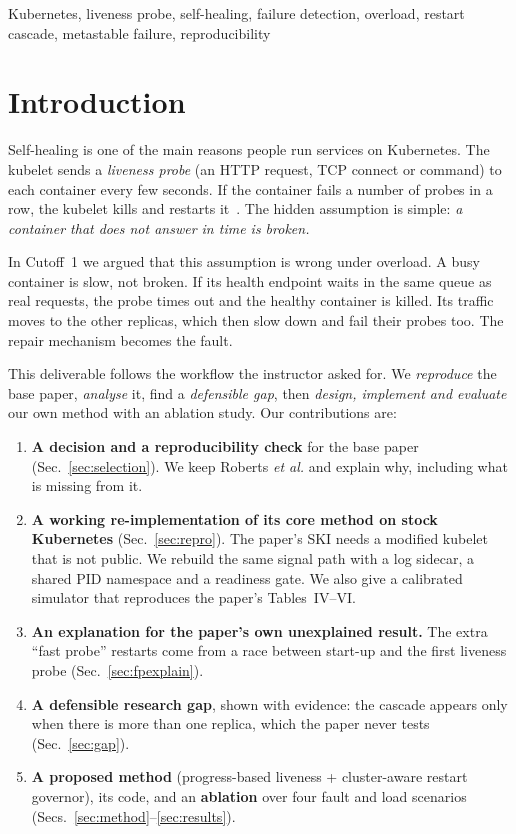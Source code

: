 \documentclass[conference]{IEEEtran}
\begin{document}
\begin{IEEEkeywords}
Kubernetes, liveness probe, self-healing, failure detection, overload,
restart cascade, metastable failure, reproducibility
\end{IEEEkeywords}

\section{Introduction}
Self-healing is one of the main reasons people run services on
Kubernetes. The kubelet sends a \emph{liveness probe} (an HTTP request,
TCP connect or command) to each container every few seconds. If the
container fails a number of probes in a row, the kubelet kills and
restarts it~\cite{k8sprobes}. The hidden assumption is simple:
\emph{a container that does not answer in time is broken.}

In Cutoff~1 we argued that this assumption is wrong under overload. A
busy container is slow, not broken. If its health endpoint waits in the
same queue as real requests, the probe times out and the healthy
container is killed. Its traffic moves to the other replicas, which then
slow down and fail their probes too. The repair mechanism becomes the
fault.

This deliverable follows the workflow the instructor asked for. We
\emph{reproduce} the base paper, \emph{analyse} it, find a
\emph{defensible gap}, then \emph{design, implement and evaluate} our own
method with an ablation study. Our contributions are:

\begin{enumerate}
\item \textbf{A decision and a reproducibility check} for the base paper
  (Sec.~\ref{sec:selection}). We keep Roberts \emph{et al.} and
  explain why, including what is missing from it.
\item \textbf{A working re-implementation of its core method on stock
  Kubernetes} (Sec.~\ref{sec:repro}). The paper's SKI needs a modified
  kubelet that is not public. We rebuild the same signal path with a log
  sidecar, a shared PID namespace and a readiness gate. We also give a
  calibrated simulator that reproduces the paper's Tables~IV--VI.
\item \textbf{An explanation for the paper's own unexplained result.}
  The extra ``fast probe'' restarts come from a race between start-up
  and the first liveness probe (Sec.~\ref{sec:fpexplain}).
\item \textbf{A defensible research gap}, shown with evidence: the
  cascade appears only when there is more than one replica, which the
  paper never tests (Sec.~\ref{sec:gap}).
\item \textbf{A proposed method} (progress-based liveness + cluster-aware
  restart governor), its code, and an \textbf{ablation} over four fault
  and load scenarios (Secs.~\ref{sec:method}--\ref{sec:results}).
\end{enumerate}
\end{document}
